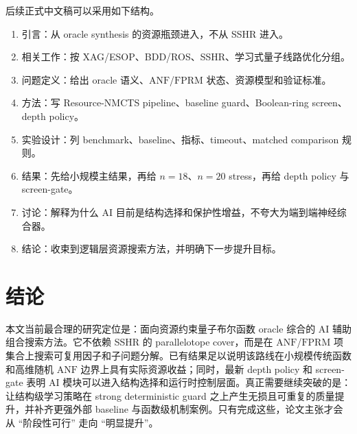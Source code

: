 \documentclass[UTF8,fontset=macnew,11pt]{ctexart}
\newcommand{\method}{Resource-NMCTS}
\newcommand{\anf}{\ensuremath{\mathrm{ANF}}}
\newcommand{\fprm}{\ensuremath{\mathrm{FPRM}}}
\begin{document}
后续正式中文稿可以采用如下结构。

\begin{enumerate}
  \item 引言：从 oracle synthesis 的资源瓶颈进入，不从 SSHR 进入。
  \item 相关工作：按 XAG/ESOP、BDD/ROS、SSHR、学习式量子线路优化分组。
  \item 问题定义：给出 oracle 语义、\anf{}/\fprm{} 状态、资源模型和验证标准。
  \item 方法：写 \method{} pipeline、baseline guard、Boolean-ring screen、depth policy。
  \item 实验设计：列 benchmark、baseline、指标、timeout、matched comparison 规则。
  \item 结果：先给小规模主结果，再给 $n=18$、$n=20$ stress，再给 depth policy 与 screen-gate。
  \item 讨论：解释为什么 AI 目前是结构选择和保护性增益，不夸大为端到端神经综合器。
  \item 结论：收束到逻辑层资源搜索方法，并明确下一步提升目标。
\end{enumerate}

\section{结论}

本文当前最合理的研究定位是：面向资源约束量子布尔函数 oracle 综合的 AI 辅助组合搜索方法。它不依赖 SSHR 的 parallelotope cover，而是在 \anf{}/\fprm{} 项集合上搜索可复用因子和子问题分解。已有结果足以说明该路线在小规模传统函数和高维随机 \anf{} 边界上具有实际资源收益；同时，最新 depth policy 和 screen-gate 表明 AI 模块可以进入结构选择和运行时控制层面。真正需要继续突破的是：让结构级学习策略在 strong deterministic guard 之上产生无损且可重复的质量提升，并补齐更强外部 baseline 与函数级机制案例。只有完成这些，论文主张才会从 ``阶段性可行'' 走向 ``明显提升''。
\end{document}
